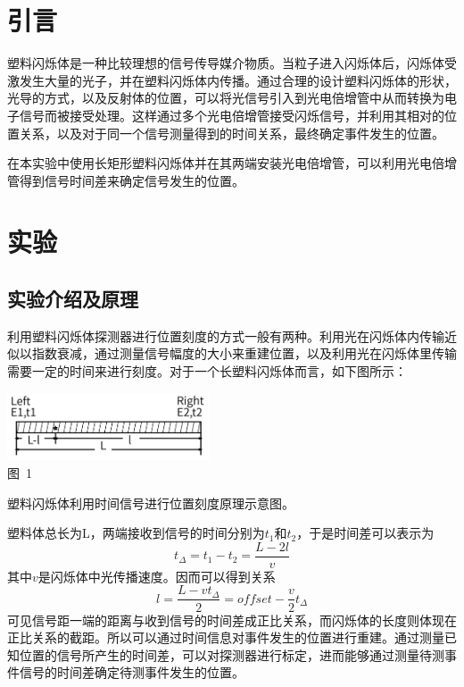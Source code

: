 \documentclass[a4paper,10.0pt,twoside]{npr}
\begin{document}
\begin{multicols}{2}

\section{引言}    %
\vspace*{-1mm}
\song\wuhao
塑料闪烁体是一种比较理想的信号传导媒介物质。当粒子进入闪烁体后，闪烁体受激发生大量的光子，并在塑料闪烁体内传播。通过合理的设计塑料闪烁体的形状，光导的方式，以及反射体的位置，可以将光信号引入到光电倍增管中从而转换为电子信号而被接受处理。这样通过多个光电倍增管接受闪烁信号，并利用其相对的位置关系，以及对于同一个信号测量得到的时间关系，最终确定事件发生的位置。

在本实验中使用长矩形塑料闪烁体并在其两端安装光电倍增管，可以利用光电倍增管得到信号时间差来确定信号发生的位置。
\section{实验}
\subsection{实验介绍及原理}

利用塑料闪烁体探测器进行位置刻度的方式一般有两种。利用光在闪烁体内传输近似以指数衰减，通过测量信号幅度的大小来重建位置，以及利用光在闪烁体里传输需要一定的时间来进行刻度。对于一个长塑料闪烁体而言，如下图所示：

\begin{center}
   \includegraphics[width=0.45\textwidth]{xinhao.png}
\\
\xiaowu\song 图~1\begin{minipage}[t]{75mm} \quad 塑料闪烁体利用时间信号进行位置刻度原理示意图。\\[-1mm]\wuhao
\end{minipage}
\end{center}
塑料体总长为L，两端接收到信号的时间分别为$t_1$和$t_2$，于是时间差可以表示为
\begin{equation}
	t_\Delta = t_1-t_2 = \frac{L-2l}{v}
\end{equation}
其中$v$是闪烁体中光传播速度。因而可以得到关系
\begin{equation}
	l=\frac{L-vt_\Delta}{2}=offset -\frac{v}{2}t_\Delta
\end{equation}
可见信号距一端的距离与收到信号的时间差成正比关系，而闪烁体的长度则体现在正比关系的截距。所以可以通过时间信息对事件发生的位置进行重建。通过测量已知位置的信号所产生的时间差，可以对探测器进行标定，进而能够通过测量待测事件信号的时间差确定待测事件发生的位置。



\end{multicols}
\end{document}
